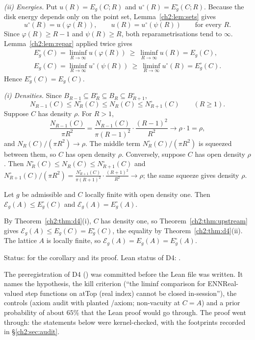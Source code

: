\begin{humanproof}
\emph{(ii) Energies.} Put $u(R)=E_g(C;R)$ and $u^\circ(R)=E^\circ_g(C;R)$. Because the disk energy depends only on the
point set, Lemma~\ref{ch2:lem:sets} gives
\[
u^\circ(R)=u(\varphi(R)),\qquad u(R)=u^\circ(\psi(R))\qquad\text{for every }R.
\]
Since $\varphi(R)\ge R-1$ and $\psi(R)\ge R$, both reparametrisations tend to $\infty$. Lemma~\ref{ch2:lem:repar} applied
twice gives
\begin{gather*}
E^\circ_g(C)=\liminf_{R\to\infty}u(\varphi(R))\ \ge\ \liminf_{R\to\infty}u(R)=E_g(C),\\
E_g(C)=\liminf_{R\to\infty}u^\circ(\psi(R))\ \ge\ \liminf_{R\to\infty}u^\circ(R)=E^\circ_g(C).
\end{gather*}
Hence $E^\circ_g(C)=E_g(C)$.

\emph{(i) Densities.} Since $B_{R-1}\subseteq B^\circ_R\subseteq B_R\subseteq B^\circ_{R+1}$,
\[
N_{R-1}(C)\le N^\circ_R(C)\le N_R(C)\le N^\circ_{R+1}(C)\qquad(R\ge1).
\]
Suppose $C$ has density $\rho$. For $R>1$,
\[
\frac{N_{R-1}(C)}{\pi R^2}=\frac{N_{R-1}(C)}{\pi(R-1)^2}\cdot\frac{(R-1)^2}{R^2}\longrightarrow\rho\cdot1=\rho,
\]
and $N_R(C)/(\pi R^2)\to\rho$. The middle term $N^\circ_R(C)/(\pi R^2)$ is squeezed between them, so $C$ has open density
$\rho$. Conversely, suppose $C$ has open density $\rho$. Then $N^\circ_R(C)\le N_R(C)\le N^\circ_{R+1}(C)$ and
$N^\circ_{R+1}(C)/(\pi R^2)=\frac{N^\circ_{R+1}(C)}{\pi(R+1)^2}\cdot\frac{(R+1)^2}{R^2}\to\rho$; the same squeeze gives
density $\rho$.
\end{humanproof}

\begin{corollary}\label{ch2:cor:open}
Let $g$ be admissible and $C$ locally finite with open density one. Then $\mathcal{E}_g(A)\le E^\circ_g(C)$ and
$\mathcal{E}_g(A)=E^\circ_g(A)$.
\end{corollary}
\begin{humanproof}
By Theorem~\ref{ch2:thm:d4}(i), $C$ has density one, so Theorem~\ref{ch2:thm:upstream} gives
$\mathcal{E}_g(A)\le E_g(C)=E^\circ_g(C)$, the equality by Theorem~\ref{ch2:thm:d4}(ii). The lattice $A$ is locally finite,
so $\mathcal{E}_g(A)=E_g(A)=E^\circ_g(A)$.
\end{humanproof}

Status: \tierC{} for the corollary and its proof. Lean status of D4: \DFourStatus.

\begin{remark}
The preregistration of D4 () was committed before the Lean file was
written. It names the hypothesis, the kill criterion (``the liminf comparison for ENNReal-valued step functions on atTop
(real index) cannot be closed in-session''), the controls (axiom audit with planted /axiom; non-vacuity at
$C=A$) and a prior probability of about $65\%$ that the Lean proof would go through. The proof went through: the
statements below were kernel-checked, with the footprints recorded in \S\ref{ch2:sec:audit}.
\end{remark}

